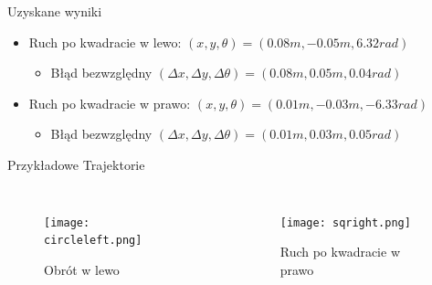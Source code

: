 \documentclass{beamer}
\begin{document}
\begin{frame}{Uzyskane wyniki}

\begin{itemize}
    \item Ruch po kwadracie w lewo: $(x, y, \theta) = (0.08m, -0.05m, 6.32rad)$
    \begin{itemize}
        \item Błąd bezwzględny $(\Delta x, \Delta y, \Delta \theta) = (0.08m, 0.05m, 0.04rad)$
    \end{itemize}
    
    \item Ruch po kwadracie w prawo: $(x, y, \theta) = (0.01m, -0.03m, -6.33rad)$
    \begin{itemize}
        \item Błąd bezwzględny $(\Delta x, \Delta y, \Delta \theta) = (0.01m, 0.03m, 0.05rad)$
    \end{itemize}
    
\end{itemize}
\end{frame}
\begin{frame}{Przykładowe Trajektorie}
\begin{columns}
 
\begin{figure}[ht]
    \centering
    \texttt{[image: circleleft.png]}
    \caption{Obrót w lewo}
\end{figure}

 
\begin{figure}[ht]
    \centering
    \texttt{[image: sqright.png]}
    \caption{Ruch po kwadracie w prawo}
\end{figure}

\end{columns}
\end{frame}
\end{document}
